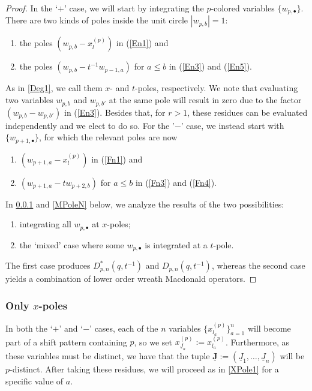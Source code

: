 \documentclass{amsart}
\newcommand{\Ju}{{\underline{J}}}
\theoremstyle{remark}
\numberwithin{thm}{section}
\numberwithin{equation}{section}
\begin{document}
\begin{proof}
In the `$+$' case, we will start by integrating the $p$-colored variables $\{w_{p,\bullet}\}$.
There are two kinds of poles inside the unit circle $|w_{p,b}|=1$:
\begin{enumerate}
\item[($x$)] the poles $\left( w_{p,b}-x_{l}^{(p)} \right)$ in (\ref{En1}) and
\item [($t$)] the poles $\left( w_{p,b}-t^{-1}w_{p-1,a} \right)$ for $a\le b$ in (\ref{En3}) and (\ref{En5}).
\end{enumerate}
As in \ref{Deg1}, we call them $x$- and $t$-poles, respectively.
We note that evaluating two variables $w_{p,b}$ and $w_{p,b'}$ at the same pole will result in zero due to the factor $\left(w_{p,b}-w_{p,b'}\right)$ in (\ref{En3}).
Besides that, for $r>1$, these residues can be evaluated independently and we elect to do so.
For the '$-$' case, we instead start with $\{w_{p+1,\bullet}\}$, for which the relevant poles are now
\begin{enumerate}
\item[($x$)] $\left( w_{p+1,a}-x_{l}^{(p)} \right)$ in (\ref{Fn1}) and
\item[($t$)] $\left( w_{p+1,a}-tw_{p+2,b} \right)$ for $a\le b$ in (\ref{Fn3}) and (\ref{Fn4}).
\end{enumerate}
In \ref{XPoleN} and \ref{MPoleN} below, we analyze the results of the two possibilities:
\begin{enumerate}
\item integrating all $w_{p,\bullet}$ at $x$-poles;
\item the `mixed' case where some $w_{p,\bullet}$ is integrated at a $t$-pole.
\end{enumerate}
The first case produces $D_{p,n}^*(q,t^{-1})$ and $D_{p,n}(q,t^{-1})$, whereas the second case yields a combination of lower order wreath Macdonald operators.
\end{proof}

\subsubsection{Only $x$-poles}\label{XPoleN}
In both the `$+$' and `$-$' cases, each of the $n$ variables $\{ x_{l_a}^{(p)} \}_{a=1}^n$ will become part of a shift pattern containing $p$, so we set $x_{\Ju_a}^{(p)}:=x_{l_a}^{(p)}$.
Furthermore, as these variables must be distinct, we have that the tuple $\mathbf{\Ju}:=\left( \Ju_1,\ldots,\Ju_n \right)$ will be $p$-distinct.
After taking these residues, we will proceed as in \ref{XPole1} for a specific value of $a$.
\end{document}
